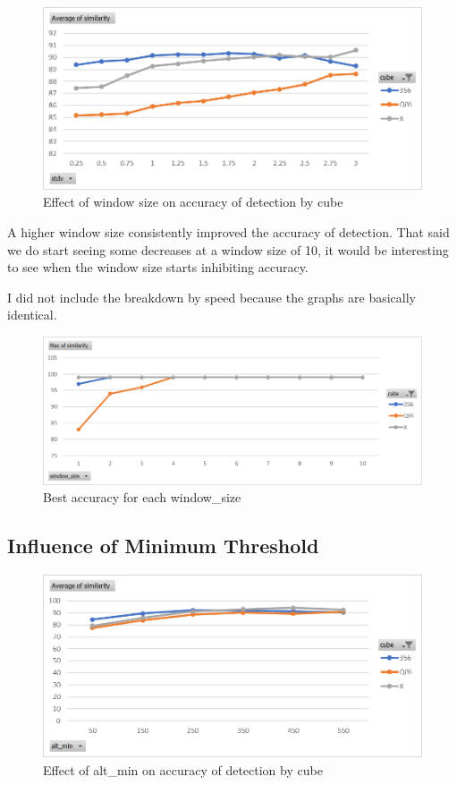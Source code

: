 \begin{figure}[h]
    \centering
    \caption{Effect of window size on accuracy of detection by cube}
    \label{fig:similarity-by-window-size}
    \includegraphics[width=0.75\linewidth]{Figures/7 Evaluation/similarity_by_cube.png}
\end{figure}

A higher window size consistently improved the accuracy of detection.
That said we do start seeing some decreases at a window size of 10, it
would be interesting to see when the window size starts inhibiting
accuracy.

I did not include the breakdown by speed because the graphs are
basically identical.

\begin{figure}[h]
    \centering
    \caption{Best accuracy for each window\_size}
    \label{fig:max-similarity-by-window-size}
    \includegraphics[width=0.75\linewidth]{Figures/7 Evaluation/max_similarity_by_window_size.png}
\end{figure}

\subsection{Influence of Minimum Threshold}

\begin{figure}[h]
    \centering
    \caption{Effect of alt\_min on accuracy of detection by cube}
    \label{fig:similarity-by-alt-min}
    \includegraphics[width=0.75\linewidth]{Figures/7 Evaluation/similarity_by_alt_min.png}
\end{figure}

